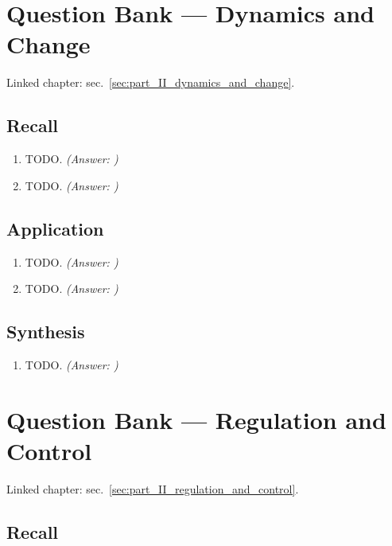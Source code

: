 \documentclass[
]{article}
\theoremstyle{plain}
\theoremstyle{definition}
\begin{document}
\newpage

\section{Question Bank --- Dynamics and
Change}\label{sec:q_part_II_dynamics_and_change}

Linked chapter: sec.~\ref{sec:part_II_dynamics_and_change}.

\subsection{Recall}\label{recall-7}

\begin{enumerate}
\def\labelenumi{\arabic{enumi}.}
\item
  TODO. \emph{(Answer: )}
\item
  TODO. \emph{(Answer: )}
\end{enumerate}

\subsection{Application}\label{application-7}

\begin{enumerate}
\def\labelenumi{\arabic{enumi}.}
\setcounter{enumi}{2}
\item
  TODO. \emph{(Answer: )}
\item
  TODO. \emph{(Answer: )}
\end{enumerate}

\subsection{Synthesis}\label{synthesis-7}

\begin{enumerate}
\def\labelenumi{\arabic{enumi}.}
\setcounter{enumi}{4}
\item
  TODO. \emph{(Answer: )}
\end{enumerate}

\newpage

\section{Question Bank --- Regulation and
Control}\label{sec:q_part_II_regulation_and_control}

Linked chapter: sec.~\ref{sec:part_II_regulation_and_control}.

\subsection{Recall}\label{recall-8}
\end{document}
